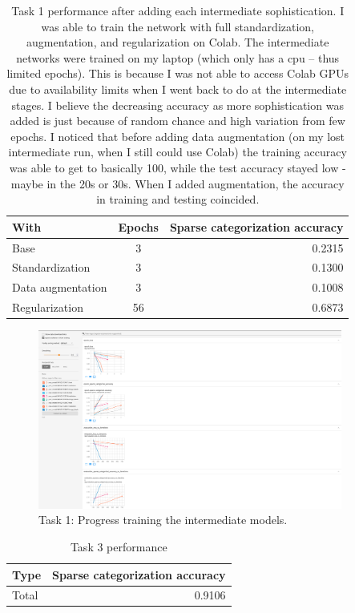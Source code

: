 
\begin{table}[H]
    \centering
    \begin{tabular}{lcr}
        \toprule
        With & Epochs & Sparse categorization accuracy \\
        \midrule
        Base & 3 & 0.2315 \\
        Standardization & 3& 0.1300 \\
        Data augmentation & 3 & 0.1008 \\
        Regularization & 56 & 0.6873 \\
        \bottomrule
    \end{tabular}
    \caption{Task 1 performance after adding each intermediate sophistication. 
I was able to train the network with full standardization, augmentation,
and regularization on Colab. The intermediate networks were trained on my laptop
(which only has a cpu -- thus limited epochs). This is because I was not able to
access Colab GPUs due to availability limits when I went back to do at the
intermediate stages.
I believe the decreasing accuracy as more sophistication was added is just
because of random chance and high variation from few epochs.
I noticed that before adding data augmentation (on my lost intermediate run, when I still
could use Colab) the training accuracy was able to get to basically 100, while
the test accuracy stayed low - maybe in the 20s or 30s. When I added
augmentation, the accuracy in training and testing coincided.}
    \label{tab:table1}
\end{table}

\begin{figure}[H]
    \includegraphics[width=10cm]{intermediate-cpu.png}
    \caption{Task 1: Progress training the intermediate models.}
    \label{fig:result1}
\end{figure}


\begin{table}[H]
    \centering
    \begin{tabular}{lr}
        \toprule
        Type & Sparse categorization accuracy \\
        \midrule
        Total & 0.9106 \\
        \bottomrule
    \end{tabular}
    \caption{Task 3 performance}
    \label{tab:table2}
\end{table}


